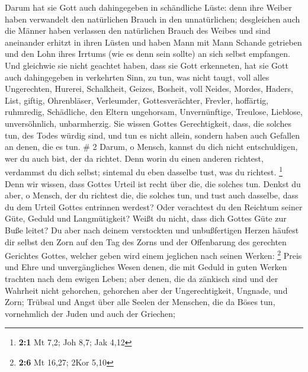  Darum hat sie Gott auch dahingegeben in schändliche
Lüste: denn ihre Weiber haben verwandelt den natürlichen Brauch in den
unnatürlichen;  desgleichen auch die Männer haben
verlassen den natürlichen Brauch des Weibes und sind aneinander erhitzt
in ihren Lüsten und haben Mann mit Mann Schande getrieben und den Lohn
ihres Irrtums (wie es denn sein sollte) an sich selbst empfangen.
 Und gleichwie sie nicht geachtet haben, dass sie Gott
erkenneten, hat sie Gott auch dahingegeben in verkehrten Sinn, zu tun,
was nicht taugt,  voll alles Ungerechten, Hurerei,
Schalkheit, Geizes, Bosheit, voll Neides, Mordes, Haders, List, giftig,
Ohrenbläser,  Verleumder, Gottesverächter, Frevler,
hoffärtig, ruhmredig, Schädliche, den Eltern ungehorsam, 
Unvernünftige, Treulose, Lieblose, unversöhnlich, unbarmherzig.
 Sie wissen Gottes Gerechtigkeit, dass, die solches tun,
des Todes würdig sind, und tun es nicht allein, sondern haben auch
Gefallen an denen, die es tun. \# 2  Darum, o Mensch,
kannst du dich nicht entschuldigen, wer du auch bist, der da richtet.
Denn worin du einen anderen richtest, verdammst du dich selbst; sintemal
du eben dasselbe tust, was du richtest. \footnote{\textbf{2:1} Mt 7,2;
  Joh 8,7; Jak 4,12}  Denn wir wissen, dass Gottes Urteil
ist recht über die, die solches tun.  Denkst du aber, o
Mensch, der du richtest die, die solches tun, und tust auch dasselbe,
dass du dem Urteil Gottes entrinnen werdest?  Oder
verachtest du den Reichtum seiner Güte, Geduld und Langmütigkeit? Weißt
du nicht, dass dich Gottes Güte zur Buße leitet?  Du aber
nach deinem verstockten und unbußfertigen Herzen häufest dir selbst den
Zorn auf den Tag des Zorns und der Offenbarung des gerechten Gerichtes
Gottes,  welcher geben wird einem jeglichen nach seinen
Werken: \footnote{\textbf{2:6} Mt 16,27; 2Kor 5,10}  Preis
und Ehre und unvergängliches Wesen denen, die mit Geduld in guten Werken
trachten nach dem ewigen Leben;  aber denen, die da
zänkisch sind und der Wahrheit nicht gehorchen, gehorchen aber der
Ungerechtigkeit, Ungnade, und Zorn;  Trübsal und Angst
über alle Seelen der Menschen, die da Böses tun, vornehmlich der Juden
und auch der Griechen;

